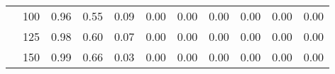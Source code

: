 \begin{table}[t]
\begin{center}
\begin{subtable}[c]{\textwidth}
\begin{center}
\begin{tabular}{rcccccccccc}
                                        & \multicolumn{1}{c|}{100}  & \num{0.96}  & \num{0.55}  & \num{0.09}  & \num{0.00}  & \num{0.00}  & \num{0.00}  & \num{0.00}  & \num{0.00}  & \num{0.00}  \\
                                        & \multicolumn{1}{c|}{125}  & \num{0.98}  & \num{0.60}  & \num{0.07}  & \num{0.00}  & \num{0.00}  & \num{0.00}  & \num{0.00}  & \num{0.00}  & \num{0.00}  \\
                                        & \multicolumn{1}{c|}{150}  & \num{0.99}  & \num{0.66}  & \num{0.03}  & \num{0.00}  & \num{0.00}  & \num{0.00}  & \num{0.00}  & \num{0.00}  & \num{0.00}  \\
                                    \end{tabular}
            \end{center}
        \end{subtable}

        \vspace{5mm}


\end{center}
\end{table}
